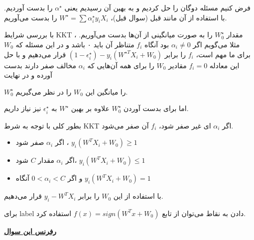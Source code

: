 \documentclass[a4paper, 12pt]{article}
\begin{document}
فرض کنیم مسئله دوگان را حل کردیم و به بهین آن رسیدیم یعنی 
$\alpha^\star$
را بدست آوردیم. 
با استفاده از آن مانند قبل (سوال قبل)، 
$W^\star = \sum \alpha^\star_i y_i X_i$
را بدست می‌آوریم.


 با بررسی شرایط 
KKT
، مقدار 
$W_0^\star$
را به صورت میانگینی از آن‌ها بدست می‌آوریم. مثلا می‌گویم اگر 
$\alpha_i \not= 0$
بود آنگاه 
$f_i$
متناظر آن باید ۰ باشد و در این مسئله که 
$W_0$
برای ما مهم است، 
$f_i$
را برابر 
$(1-\epsilon_i^\star) - y_i(W^{\star T} X_i + W_0)$
قرار می‌دهیم و با حل این معادله 
$f_i= 0$
مقادیر 
$W_0$
را برای همه آن‌هایی که 
$\alpha_i$
مخالف صفر دارند بدست آورده و در نهایت 

$W_0^\star$
را میانگین این 
$W_0$
را در نظر می‌گیریم.


اما برای بدست آوردن 
$W_0^\star$
علاوه بر بهین 
$W^\star$
به 
$\epsilon_i^\star$
نیز نیاز داریم. 


بطور کلی با توجه به شرط KKT اگر 
$\alpha_i$
ای غیر صفر شود، 
$f_i$
آن صفر می‌شود. 
\begin{itemize}
	\item 
	اگر
	$\alpha_i$
	صفر شود ، 
	$y_i(W^TX_i + W_0) \geq 1$
	\item
	اگر 
	$\alpha_i$
	مقدار 
	$C$
	شود، 
	$y_i(W^TX_i + W_0) \leq 1$
	\item
	و اگر 
	$0 < \alpha_i < C$
	آنگاه
	$y_i(W^TX_i + W_0) = 1$
\end{itemize}
با استفاده از این 
$W_0$
را برابر 
$y_i - W^TX_i$
قرار می‌دهیم.


برای label دادن به نقاط می‌توان از تابع 
$f(x) = sign(W^Tx + W_0)$
استفاده کرد.
\begin{center}
	\href{http://www.nathanielhobbs.com/documents/cvx_opt/cvx_opt_final_report.pdf}{\textbf{رفرنس این سوال}}
\end{center}
\end{document}
